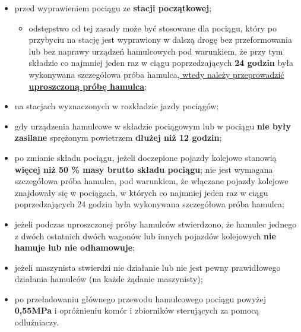 \begin{itemize}
	\item przed wyprawieniem pociągu ze \textbf{stacji początkowej}; 
	
	\begin{itemize}
		\item odstępstwo od tej zasady może być stosowane dla pociągu, który po przybyciu na stację jest wyprawiony w dalszą
		drogę bez przeformowania lub bez naprawy urządzeń hamulcowych pod warunkiem, że przy tym składzie co najmniej jeden raz
		w ciągu poprzedzających \textbf{24 godzin} była wykonywana szczegółowa próba hamulca,\underline{ wtedy należy przeprowadzić \textbf{uproszczoną próbę hamulca}}; 
	\end{itemize}
	\item na stacjach wyznaczonych w rozkładzie jazdy pociągów;
	\item gdy urządzenia hamulcowe w składzie pociągowym lub w pociągu \textbf{nie były} \textbf{zasilane} sprężonym powietrzem \textbf{dłużej niż 12 godzin}; 
	\item po zmianie składu pociągu, jeżeli doczepione pojazdy kolejowe stanowią \textbf{więcej niż 50 \% masy brutto składu pociągu}; nie jest wymagana szczegółowa próba hamulca, pod warunkiem, że włączane pojazdy kolejowe znajdowały się w pociągach, w których co najmniej jeden raz w ciągu poprzedzających 24 godzin była wykonywana szczegółowa próba hamulca;
	
	\item jeżeli podczas uproszczonej próby hamulców stwierdzono, że hamulec jednego z dwóch ostatnich dwóch wagonów lub innych pojazdów kolejowych \textbf{nie hamuje lub nie odhamowuje}; 
	\item jeżeli maszynista stwierdzi nie działanie lub nie jest pewny prawidłowego działania hamulców (na każde żądanie maszynisty); 
	\item po przeładowaniu głównego przewodu hamulcowego pociągu powyżej \textbf{0,55MPa} i opróżnieniu komór i zbiorników sterujących za pomocą odluźniaczy.
\end{itemize}


